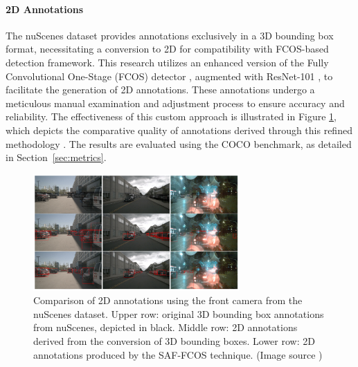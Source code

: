 \documentclass[report.tex]{subfiles}
\begin{document}
    \paragraph*{2D Annotations}

    The nuScenes dataset provides annotations exclusively in a 3D bounding box format, necessitating a conversion to 2D for compatibility with FCOS-based detection framework. This research utilizes an enhanced version of the Fully Convolutional One-Stage (FCOS) detector \cite{tian2019fcos}, augmented with ResNet-101 \cite{he2016deep}, to facilitate the generation of 2D annotations. These annotations undergo a meticulous manual examination and adjustment process to ensure accuracy and reliability. The effectiveness of this custom approach is illustrated in Figure \ref{fig:saffcos_annotations}, which depicts the comparative quality of annotations derived through this refined methodology \cite{chang2020spatial}. The results are evaluated using the COCO benchmark, as detailed in Section~\ref{sec:metrics}.

    \begin{figure}[h]
        \centering
        \includegraphics[width=0.7\textwidth]{images/methods/saf_fcos/annotations of front camera in nuScenes dataset.png}
        \caption{Comparison of 2D annotations using the front camera from the nuScenes dataset. Upper row: original 3D bounding box annotations from nuScenes, depicted in black. Middle row: 2D annotations derived from the conversion of 3D bounding boxes. Lower row: 2D annotations produced by the SAF-FCOS technique. (Image source \cite{chang2020spatial})}
        \label{fig:saffcos_annotations}
    \end{figure}

\end{document}

